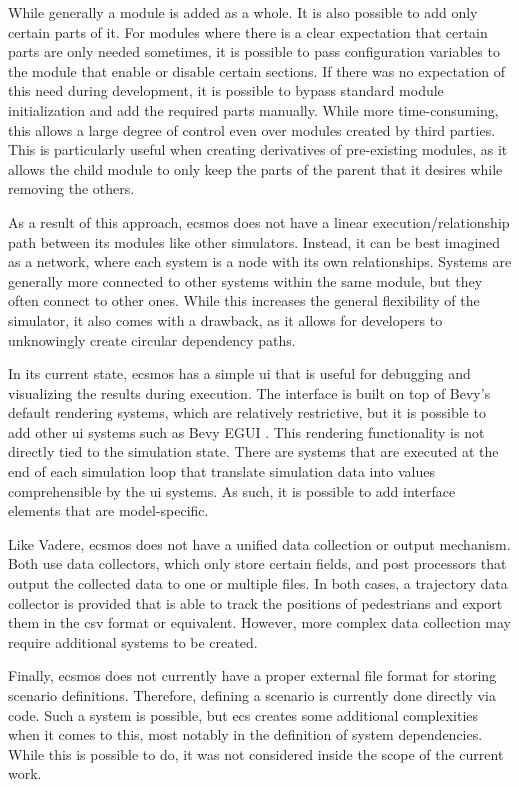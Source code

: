 \documentclass[twoside, 11pt]{article}
\begin{document}
While generally a module is added as a whole. It is also possible to add only certain parts of it. For modules where there is a clear expectation that certain parts are only needed sometimes, it is possible to pass configuration variables to the module that enable or disable certain sections. If there was no expectation of this need during development, it is possible to bypass standard module initialization and add the required parts manually. While more time-consuming, this allows a large degree of control even over modules created by third parties. This is particularly useful when creating derivatives of pre-existing modules, as it allows the child module to only keep the parts of the parent that it desires while removing the others.

As a result of this approach, \gls{ecsmos} does not have a linear execution/relationship path between its modules like other simulators. Instead, it can be best imagined as a network, where each system is a node with its own relationships. Systems are generally more connected to other systems within the same module, but they often connect to other ones. While this increases the general flexibility of the simulator, it also comes with a drawback, as it allows for developers to unknowingly create circular dependency paths.

In its current state, \gls{ecsmos} has a simple \gls{ui} that is useful for debugging and visualizing the results during execution. The interface is built on top of Bevy's default rendering systems, which are relatively restrictive, but it is possible to add other \gls{ui} systems such as Bevy EGUI \cite{bevyegui}. This rendering functionality is not directly tied to the simulation state. There are systems that are executed at the end of each simulation loop that translate simulation data into values comprehensible by the \gls{ui} systems. As such, it is possible to add interface elements that are model-specific. 

Like Vadere, \gls{ecsmos} does not have a unified data collection or output mechanism. Both use data collectors, which only store certain fields, and post processors that output the collected data to one or multiple files. In both cases, a trajectory data collector is provided that is able to track the positions of pedestrians and export them in the \gls{csv} format or equivalent. However, more complex data collection may require additional systems to be created.

Finally, \gls{ecsmos} does not currently have a proper external file format for storing scenario definitions. Therefore, defining a scenario is currently done directly via code. Such a system is possible, but \gls{ecs} creates some additional complexities when it comes to this, most notably in the definition of system dependencies. While this is possible to do, it was not considered inside the scope of the current work.
\end{document}
